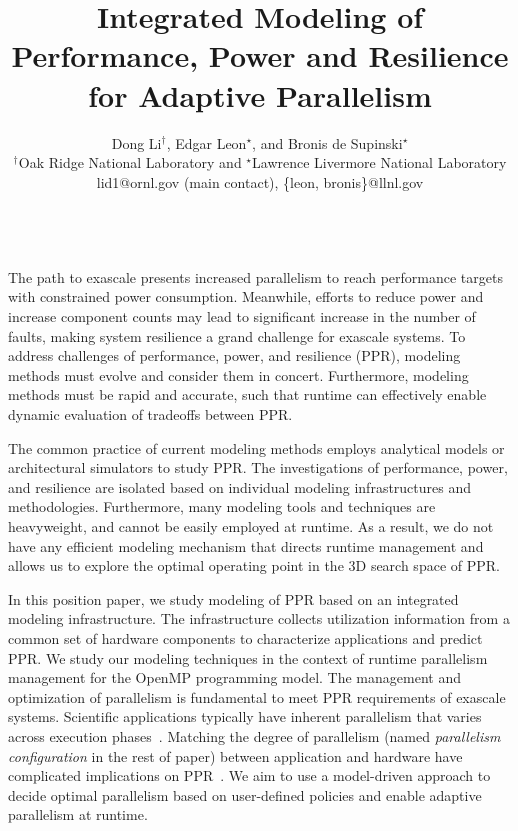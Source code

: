 \documentclass{article}  %
\begin{document}
\title{Integrated Modeling of Performance, Power and Resilience for Adaptive Parallelism}

\author{Dong Li$^{\dag}$, Edgar Leon$^{\star}$, and Bronis de Supinski$^{\star}$ \\
    $^{\dag}$Oak Ridge National Laboratory and $^{\star}$Lawrence Livermore National Laboratory \\
    lid1@ornl.gov (main contact), \{leon, bronis\}@llnl.gov	\\
}

\date{}

\maketitle

   \\
The path to exascale presents increased parallelism to reach performance targets with constrained power consumption.
Meanwhile, efforts to reduce power and increase component counts may lead to significant increase in the number of faults,
making system resilience a grand challenge for exascale systems. To address challenges of 
performance, power, and resilience (PPR), modeling methods must evolve and consider
them in concert. Furthermore, modeling methods must be rapid and accurate, such that
runtime can effectively enable dynamic evaluation of tradeoffs between PPR.

The common practice of current modeling methods employs analytical models or architectural simulators to study PPR.
The investigations of performance, power, and resilience are isolated based on individual modeling infrastructures
and methodologies.
Furthermore, many modeling tools and techniques are heavyweight, and cannot be easily employed at runtime.
As a result, we do not have any efficient modeling mechanism that directs runtime management 
and allows us to explore the optimal operating point in the 3D search space of PPR.

In this position paper, we study modeling of PPR based on an integrated %
modeling infrastructure. 
The infrastructure collects utilization information from 
a common set of hardware components to characterize applications and predict PPR.
We study our modeling techniques in the context of runtime parallelism management for the OpenMP
programming model.
The management and optimization of parallelism is fundamental to meet PPR requirements
of exascale systems.
Scientific applications typically have inherent parallelism that varies across execution phases~\cite{nvram_ipdps12}.
Matching the degree of parallelism (named \textit{parallelism configuration} in the rest of paper) between application and hardware
have complicated implications on PPR~\cite{mpiopenmp_ipdps10, mpiopenmp_tpds13, dsn_pact08, dsn_ics06}. 
We aim to use a model-driven approach to decide optimal parallelism based on user-defined policies
and enable adaptive parallelism at runtime.
\end{document}
